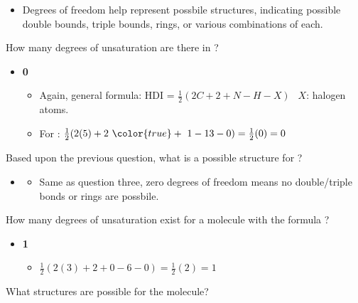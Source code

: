 \documentclass[12pt,a4paper]{article}
\begin{document}
\begin{enumerate}
\begin{itemize}
\begin{itemize}
                    \item Degrees of freedom help represent possbile structures, indicating possible double bounds, triple bounds, rings, or various combinations of each.
                \end{itemize}
        \end{itemize}
    {\color{G-Moon}\item How many degrees of unsaturation are there in ?}
        \begin{itemize}
            \item {\color{o-Sun}\textbf{0}}
                \begin{itemize}
                    \item Again, general formula: {\color{o-Sun}HDI = \(\frac{1}{2}(2C + 2 + N - H - X)~~\)} \(X\): halogen atoms.
                    \item For :  \(\frac{1}{2}(2(5) + 2~ {\color{true}+~1} - 13 - 0) = \frac{1}{2}(0) = 0\)
                \end{itemize}
        \end{itemize}
    {\color{G-Moon}\item Based upon the previous question, what is a possible structure for ?}
        \begin{itemize}
            \item {\color{o-Sun}}
                \begin{itemize}
                    \item Same as question three, {\color{o-Sun}zero degrees of freedom} means {\color{false}no double/triple bonds or rings} are possbile.
                \end{itemize}
        \end{itemize}
    {\color{G-Moon}\item How many degrees of unsaturation exist for a molecule with the formula ?}
        \begin{itemize}
            \item {\color{o-Sun}\textbf{1}}
                \begin{itemize}
                    \item \(\frac{1}{2}(2(3) + 2 + 0 - 6 - 0) = \frac{1}{2}(2) = 1\)
                \end{itemize}
        \end{itemize}
    {\color{G-Moon}\item What structures are possible for the  molecule?}

\end{enumerate}
\end{document}
